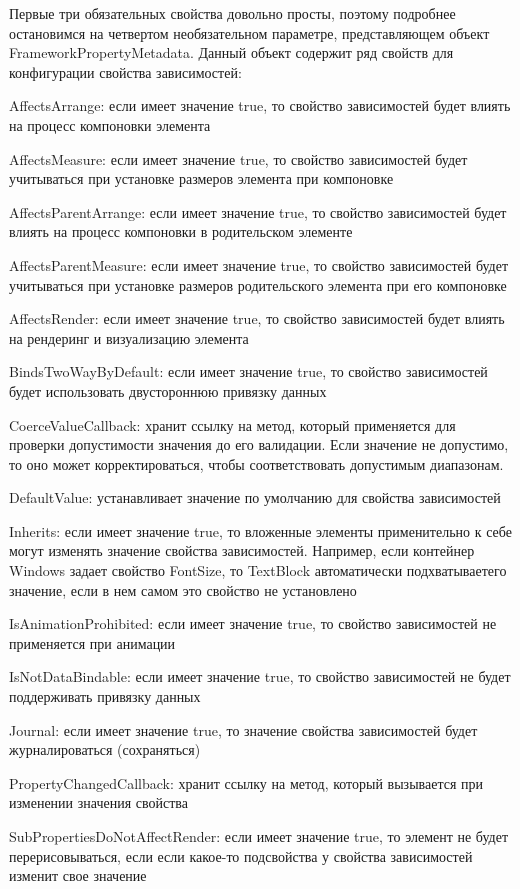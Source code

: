 Первые три обязательных свойства довольно просты, поэтому подробнее остановимся на четвертом необязательном параметре, представляющем объект FrameworkPropertyMetadata. Данный объект содержит ряд свойств для конфигурации свойства зависимостей:

AffectsArrange: если имеет значение true, то свойство зависимостей будет влиять на процесс компоновки элемента

AffectsMeasure: если имеет значение true, то свойство зависимостей будет учитываться при установке размеров элемента при компоновке

AffectsParentArrange: если имеет значение true, то свойство зависимостей будет влиять на процесс компоновки в родительском элементе

AffectsParentMeasure: если имеет значение true, то свойство зависимостей будет учитываться при установке размеров родительского элемента при его компоновке

AffectsRender: если имеет значение true, то свойство зависимостей будет влиять на рендеринг и визуализацию элемента

BindsTwoWayByDefault: если имеет значение true, то свойство зависимостей будет использовать двустороннюю привязку данных

CoerceValueCallback: хранит ссылку на метод, который применяется для проверки допустимости значения до его валидации. Если значение не допустимо, то оно может корректироваться, чтобы соответствовать допустимым диапазонам.

DefaultValue: устанавливает значение по умолчанию для свойства зависимостей

Inherits: если имеет значение true, то вложенные элементы применительно к себе могут изменять значение свойства зависимостей. Например, если контейнер Windows задает свойство FontSize, то TextBlock автоматически подхватываетего значение, если в нем самом это свойство не установлено

IsAnimationProhibited: если имеет значение true, то свойство зависимостей не применяется при анимации

IsNotDataBindable: если имеет значение true, то свойство зависимостей не будет поддерживать привязку данных

Journal: если имеет значение true, то значение свойства зависимостей будет журналироваться (сохраняться)

PropertyChangedCallback: хранит ссылку на метод, который вызывается при изменении значения свойства

SubPropertiesDoNotAffectRender: если имеет значение true, то элемент не будет перерисовываться, если если какое-то подсвойства у свойства зависимостей изменит свое значение

